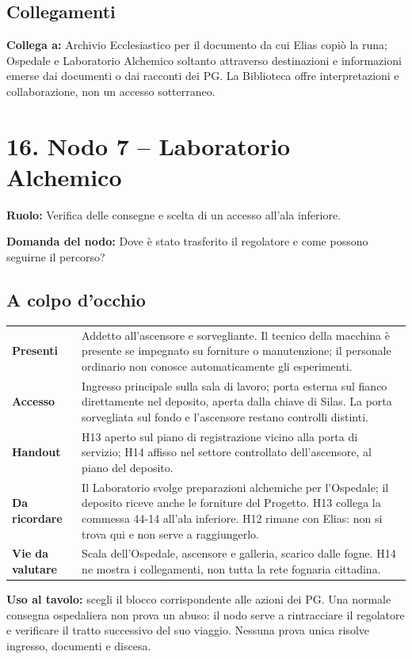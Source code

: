 \documentclass[11pt,a4paper]{article}
\newcommand{\yhdivider}{%
  \par\nobreak\noindent
  \begin{tikzpicture}
    \fill[brass!85] (0,0) -- (0,.7mm) -- (\linewidth,.18mm) -- cycle;
  \end{tikzpicture}\par\nobreak}
\newcommand{\nodehead}[3]{%
\clearpage
{\titleformat{\section}{\displayfont\huge\scshape\color{blood}}{}{0pt}{}[\yhdivider]%
\section{#1}}
\begin{bloodbox}[title={Il nodo al tavolo}]
\textbf{Ruolo:} #2\par\smallskip
\textbf{Domanda del nodo:} #3
\end{bloodbox}}
\newcommand{\linkto}[1]{\begin{routebox}\textbf{Collega a:} #1\end{routebox}}
\begin{document}
\subsection{Collegamenti}
\linkto{Archivio Ecclesiastico per il documento da cui Elias copiò la runa; Ospedale e Laboratorio Alchemico soltanto attraverso destinazioni e informazioni emerse dai documenti o dai racconti dei PG. La Biblioteca offre interpretazioni e collaborazione, non un accesso sotterraneo.}

\nodehead{16. Nodo 7 -- Laboratorio Alchemico}{Verifica delle consegne e scelta di un accesso all'ala inferiore.}{Dove è stato trasferito il regolatore e come possono seguirne il percorso?}

\subsection{A colpo d'occhio}
\begin{overviewbox}
\begin{tabularx}{\linewidth}{>{\bfseries}p{32mm} X}
Presenti & Addetto all'ascensore e sorvegliante. Il tecnico della macchina è presente se impegnato su forniture o manutenzione; il personale ordinario non conosce automaticamente gli esperimenti.\\
Accesso & Ingresso principale sulla sala di lavoro; porta esterna sul fianco direttamente nel deposito, aperta dalla chiave di Silas. La porta sorvegliata sul fondo e l'ascensore restano controlli distinti.\\
Handout & H13 aperto sul piano di registrazione vicino alla porta di servizio; H14 affisso nel settore controllato dell'ascensore, al piano del deposito.\\
Da ricordare & Il Laboratorio svolge preparazioni alchemiche per l'Ospedale; il deposito riceve anche le forniture del Progetto. H13 collega la commessa 44-14 all'ala inferiore. H12 rimane con Elias: non si trova qui e non serve a raggiungerlo.\\
Vie da valutare & Scala dell'Ospedale, ascensore e galleria, scarico dalle fogne. H14 ne mostra i collegamenti, non tutta la rete fognaria cittadina.\\
\end{tabularx}
\end{overviewbox}

\textbf{Uso al tavolo:} scegli il blocco corrispondente alle azioni dei PG. Una normale consegna ospedaliera non prova un abuso: il nodo serve a rintracciare il regolatore e verificare il tratto successivo del suo viaggio. Nessuna prova unica risolve ingresso, documenti e discesa.
\end{document}
